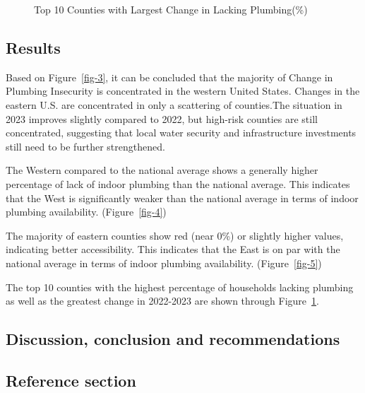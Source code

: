 \documentclass[
  letterpaper,
  DIV=11,
  numbers=noendperiod]{scrartcl}
\begin{document}
\begin{figure}


\caption{\label{fig-6}Top 10 Counties with Largest Change in Lacking
Plumbing(\%)}

\end{figure}%

\subsection{Results}\label{results}

Based on Figure~\ref{fig-3}, it can be concluded that the majority of
Change in Plumbing Insecurity is concentrated in the western United
States. Changes in the eastern U.S. are concentrated in only a
scattering of counties.The situation in 2023 improves slightly compared
to 2022, but high-risk counties are still concentrated, suggesting that
local water security and infrastructure investments still need to be
further strengthened.

The Western compared to the national average shows a generally higher
percentage of lack of indoor plumbing than the national average. This
indicates that the West is significantly weaker than the national
average in terms of indoor plumbing availability. (Figure~\ref{fig-4})

The majority of eastern counties show red (near 0\%) or slightly higher
values, indicating better accessibility. This indicates that the East is
on par with the national average in terms of indoor plumbing
availability. (Figure~\ref{fig-5})

The top 10 counties with the highest percentage of households lacking
plumbing as well as the greatest change in 2022-2023 are shown through
Figure~\ref{fig-6}.

\subsection{Discussion, conclusion and
recommendations}\label{discussion-conclusion-and-recommendations}

\subsection{Reference section}\label{reference-section}
\end{document}
